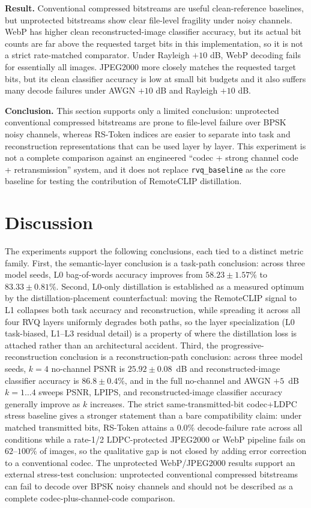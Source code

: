 \documentclass[lettersize,journal]{IEEEtran}
\begin{document}
\textbf{Result.} Conventional compressed bitstreams are useful clean-reference baselines, but unprotected bitstreams show clear file-level fragility under noisy channels. WebP has higher clean reconstructed-image classifier accuracy, but its actual bit counts are far above the requested target bits in this implementation, so it is not a strict rate-matched comparator. Under Rayleigh $+10$ dB, WebP decoding fails for essentially all images. JPEG2000 more closely matches the requested target bits, but its clean classifier accuracy is low at small bit budgets and it also suffers many decode failures under AWGN $+10$ dB and Rayleigh $+10$ dB.

\textbf{Conclusion.} This section supports only a limited conclusion: unprotected conventional compressed bitstreams are prone to file-level failure over BPSK noisy channels, whereas RS-Token indices are easier to separate into task and reconstruction representations that can be used layer by layer. This experiment is not a complete comparison against an engineered ``codec + strong channel code + retransmission'' system, and it does not replace \texttt{rvq\_baseline} as the core baseline for testing the contribution of RemoteCLIP distillation.

\section{Discussion}
The experiments support the following conclusions, each tied to a distinct metric family. First, the semantic-layer conclusion is a task-path conclusion: across three model seeds, L0 bag-of-words accuracy improves from $58.23\pm1.57\%$ to $83.33\pm0.81\%$. Second, L0-only distillation is established as a measured optimum by the distillation-placement counterfactual: moving the RemoteCLIP signal to L1 collapses both task accuracy and reconstruction, while spreading it across all four RVQ layers uniformly degrades both paths, so the layer specialization (L0 task-biased, L1--L3 residual detail) is a property of where the distillation loss is attached rather than an architectural accident. Third, the progressive-reconstruction conclusion is a reconstruction-path conclusion: across three model seeds, $k{=}4$ no-channel PSNR is $25.92\pm0.08$~dB and reconstructed-image classifier accuracy is $86.8\pm0.4\%$, and in the full no-channel and AWGN $+5$~dB $k=1\ldots4$ sweeps PSNR, LPIPS, and reconstructed-image classifier accuracy generally improve as $k$ increases. The strict same-transmitted-bit codec+LDPC stress baseline gives a stronger statement than a bare compatibility claim: under matched transmitted bits, RS-Token attains a $0.0\%$ decode-failure rate across all conditions while a rate-1/2 LDPC-protected JPEG2000 or WebP pipeline fails on $62$--$100\%$ of images, so the qualitative gap is not closed by adding error correction to a conventional codec. The unprotected WebP/JPEG2000 results support an external stress-test conclusion: unprotected conventional compressed bitstreams can fail to decode over BPSK noisy channels and should not be described as a complete codec-plus-channel-code comparison.
\end{document}
